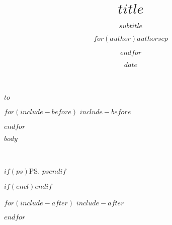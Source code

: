 \documentclass[$if(subject-titled)$subject=titled,$endif$$if(fontsize)$$fontsize$,$endif$$if(lang)$$lang$,$endif$$if(papersize)$$papersize$,$endif$$for(classoption)$$classoption$$sep$,$endfor$]{scrlttr2}
\title{$title$}
\subtitle{$subtitle$}
\author{$for(author)$$author$$sep$ \and $endfor$}
\date{$date$}
\begin{document}
\begin{letter}{%
$to$
}

$for(include-before)$
$include-before$

$endfor$

\opening{}

$body$

\closing{}

$if(ps)$\ps{$ps$}$endif$

$if(encl)$$endif$

$for(include-after)$
$include-after$

$endfor$

\end{letter}
\end{document}
